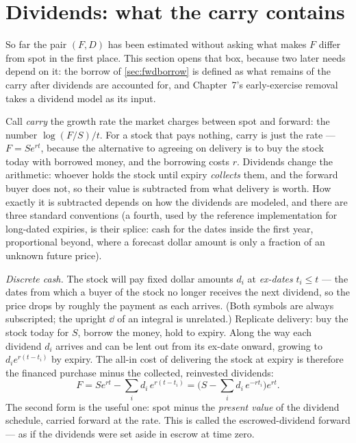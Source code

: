 \section{Dividends: what the carry contains}
\label{sec:fwddivs}

So far the pair $(F,D)$ has been estimated without asking what makes
$F$ differ from spot in the first place.  This section opens that
box, because two later needs depend on it: the borrow of
\cref{sec:fwdborrow} is defined as what remains of the carry after
dividends are accounted for, and Chapter~7's early-exercise removal
takes a dividend model as its input.

Call \emph{carry} the growth rate the market charges between spot and
forward: the number $\log(F/S)/t$.  For a stock that pays nothing,
carry is just the rate --- $F=Se^{rt}$, because the alternative to
agreeing on delivery is to buy the stock today with borrowed money,
and the borrowing costs $r$.  Dividends change the arithmetic: whoever
holds the stock until expiry \emph{collects} them, and the forward
buyer does not, so their value is subtracted from what delivery is
worth.  How exactly it is subtracted depends on how the dividends are
modeled, and there are three standard conventions (a fourth, used by
the reference implementation for long-dated expiries, is their
splice: cash for the dates inside the first year, proportional
beyond, where a forecast dollar amount is only a fraction of an
unknown future price).

\emph{Discrete cash.}  The stock will pay fixed dollar amounts $d_i$
at \emph{ex-dates} $t_i\le t$ --- the dates from which a buyer of the
stock no longer receives the next dividend, so the price drops by
roughly the payment as each arrives.  (Both symbols are always
subscripted; the upright $\dd$ of an integral is unrelated.)  Replicate delivery: buy the stock
today for $S$, borrow the money, hold to expiry.  Along the way each
dividend $d_i$ arrives and can be lent out from its ex-date onward,
growing to $d_ie^{r(t-t_i)}$ by expiry.  The all-in cost of delivering
the stock at expiry is therefore the financed purchase minus the
collected, reinvested dividends:
\begin{equation}
F=Se^{rt}-\sum_i d_i\,e^{r(t-t_i)}
=\Big(S-\sum_i d_i\,e^{-rt_i}\Big)e^{rt}.
\label{eq:fwdescrow}
\end{equation}
The second form is the useful one: spot minus the \emph{present value}
of the dividend schedule, carried forward at the rate.  This is called
the escrowed-dividend forward --- as if the dividends were set aside
in escrow at time zero.

